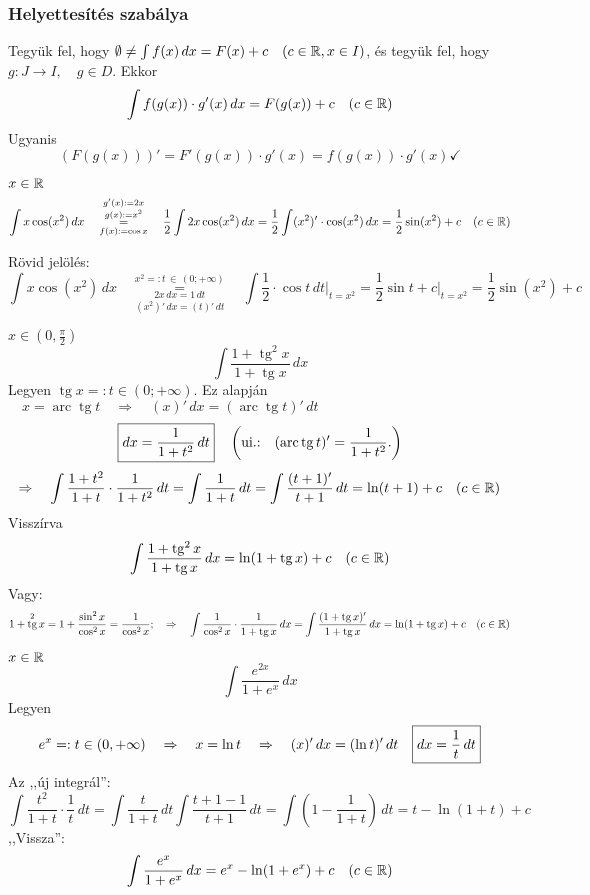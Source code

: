 \documentclass[a4paper,11.5pt]{article}
\DeclareMathOperator{\tg}{tg}
\DeclareMathOperator{\arc}{arc}
\begin{document}
	\subsubsection{Helyettesítés szabálya}
	\begin{revision}
		Tegyük fel, hogy $\emptyset\not=\int f(x)\,dx=F(x)+c\quad (c\in\mathbb{R}, x\in I)$, és tegyük fel, hogy\\ $g:J\to I, \quad g\in D.$ Ekkor
		\[ \int f(g(x))\cdot g'(x)\,dx=F(g(x))+c\quad (c\in\mathbb{R}) \]
		Ugyanis
		\[ (F(g(x)))'=F'(g(x))\cdot g'(x)=f(g(x))\cdot g'(x)\checkmark \]
	\end{revision}
	\begin{task}$x\in\mathbb{R}$
		\[ \int x\cos(x^2)\,dx\quad \overset{g'(x):=2x}{\overset{g(x):=x^2}{\underset{f(x):=\cos x}{=}}}\quad \frac{1}{2}\int 2x\cos(x^2)\,dx=\frac{1}{2}\int(x^2)'\cdot\cos(x^2)\,dx=\frac{1}{2}\sin(x^2)+c\quad (c\in\mathbb{R}) \]
	\end{task}
	\begin{note}
		Rövid jelölés: 
		\[ \int x\cos(x^2)\,dx\quad \overset{x^2=:t\,\in\,(0;+\infty)}{\underset{(x^2)'\,dx=(t)'\,dt}{\underset{2x\,dx=1\,dt}{=}}}\quad\int\frac{1}{2}\cdot\cos t\,dt\big|_{t=x^2}=\frac{1}{2}\sin t +c\big|_{t=x^2}=\frac{1}{2}\sin(x^2)+c  \]
	\end{note}
	\begin{task}$x\in(0,\frac{\pi}{2})$
		\[ \int\frac{1+\tg^2x}{1+\tg x}\,dx \]
		Legyen  \quad $\tg x=:t\in(0;+\infty).$ \quad Ez alapján $\quad  x=\arc\tg t\quad \Rightarrow\quad (x)'\,dx=(\arc\tg t)'\,dt$
		\[ \text{\fbox{$\displaystyle dx=\frac{1}{1+t^2}\,dt$}} \quad \left(\text{ui.:\quad }(\arc\tg t)'=\frac{1}{1+t^2}.\right)\]
		\[ \Rightarrow\quad \int\frac{1+t^2}{1+t}\cdot\frac{1}{1+t^2}\,dt=\int\frac{1}{1+t}\,dt=\int\frac{(t+1)'}{t+1}\,dt=\ln(t+1)+c\quad (c\in\mathbb{R}) \]
		Visszírva
		\[ \int\frac{1+\tg^2 x}{1+\tg x}\,dx=\ln(1+\tg x)+c\quad (c\in\R) \]
		Vagy:
		\[ 1+\tg^2 x=1+\frac{\sin^2x}{\cos^2x}=\frac{1}{\cos^2x};\quad \Rightarrow\quad \int\frac{1}{\cos^2x}\cdot\frac{1}{1+\tg x}\,dx=\int\frac{(1+\tg x)'}{1+\tg x}\,dx=\ln(1+\tg x)+c\quad (c\in\R) \]
	\end{task}
	\begin{task}$x\in\mathbb{R}$
		\[ \int\frac{e^{2x}}{1+e^x}\,dx \]
		Legyen \[e^x=:t\in(0,+\infty)\quad \Rightarrow\quad x=\ln t\quad \Rightarrow\quad (x)'\,dx=(\ln t)'\,dt\quad \text{\fbox{$\displaystyle dx=\frac{1}{t}\,dt$}} \]
		Az ,,új integrál'':\quad \[\displaystyle \int\frac{t^2}{1+t}\cdot\frac{1}{t}\,dt=\int\frac{t}{1+t}\,dt\int\frac{t+1-1}{t+1}\,dt=\int\left(1-\frac{1}{1+t}\right)\,dt=t-\ln(1+t)+c \]
		,,Vissza'':
		\[ \int\frac{e^x}{1+e^x}\,dx=e^x-\ln(1+e^x)+c\quad (c\in\mathbb{R}) \]
	\end{task}
\end{document}
